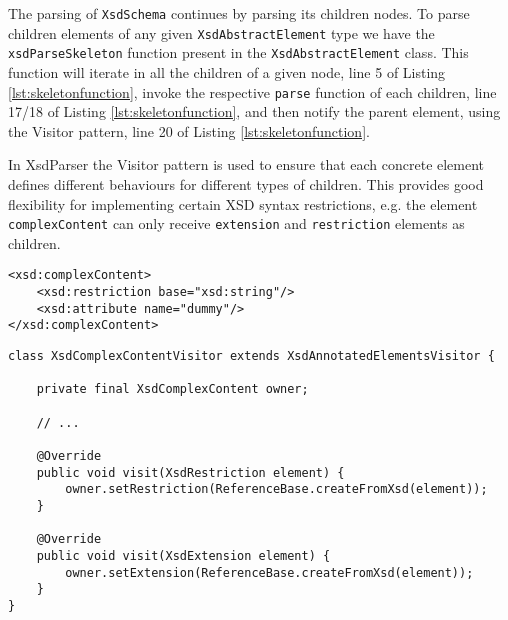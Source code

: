\noindent
The parsing of \texttt{XsdSchema} continues by parsing its children nodes. To parse children elements of any given \texttt{XsdAbstractElement} type we have the \texttt{xsdParseSkeleton} function present in the \texttt{XsdAbstractElement} class. This function will iterate in all the children of a given node, line 5 of Listing \ref{lst:skeletonfunction}, invoke the respective \texttt{parse} function of each children, line 17/18 of Listing \ref{lst:skeletonfunction}, and then notify the parent element, using the Visitor pattern\cite{gamma1994design}, line 20 of Listing \ref{lst:skeletonfunction}.

\noindent
In XsdParser the Visitor pattern is used to ensure that each concrete element defines different behaviours for different types of children. This provides good flexibility for implementing certain \ac{XSD} syntax restrictions, e.g. the element \texttt{complexContent} can only receive \texttt{extension} and \texttt{restriction} elements as children.


\begin{lstlisting}[caption={ComplexContent element with Restriction and Attribute children},captionpos=b,label={lst:contentvisitorexample}]
<xsd:complexContent>
    <xsd:restriction base="xsd:string"/>
    <xsd:attribute name="dummy"/>
</xsd:complexContent> 
\end{lstlisting}

\newpage


\begin{lstlisting}[caption={XsdComplexContentVisitor Class},captionpos=b,label={lst:complexcontentvisitor}]
class XsdComplexContentVisitor extends XsdAnnotatedElementsVisitor {

    private final XsdComplexContent owner;

    // ...

    @Override
    public void visit(XsdRestriction element) {
        owner.setRestriction(ReferenceBase.createFromXsd(element));
    }

    @Override
    public void visit(XsdExtension element) {
        owner.setExtension(ReferenceBase.createFromXsd(element));
    }
}
\end{lstlisting}

